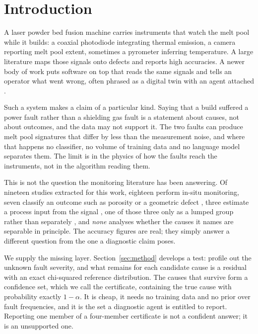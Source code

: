 \documentclass[preprint,12pt]{elsarticle}
\begin{document}
\section{Introduction}
\label{sec:intro}

A laser powder bed fusion machine carries instruments that watch the melt pool
while it builds: a coaxial photodiode integrating thermal emission, a camera
reporting melt pool extent, sometimes a pyrometer inferring temperature. A large
literature maps those signals onto defects and reports high accuracies. A newer
body of work puts software on top that reads the same signals and tells an
operator what went wrong, often phrased as a digital twin with an agent attached
\cite{Chen2025}.

Such a system makes a claim of a particular kind. Saying that a build suffered a
power fault rather than a shielding gas fault is a statement about causes, not
about outcomes, and the data may not support it. The two faults can produce melt
pool signatures that differ by less than the measurement noise, and where that
happens no classifier, no volume of training data and no language model
separates them. The limit is in the physics of how the faults reach the
instruments, not in the algorithm reading them.

This is not the question the monitoring literature has been answering. Of
nineteen studies extracted for this work, eighteen perform in-situ monitoring,
seven classify an outcome such as porosity or a geometric defect
\cite{Scime2019,Bugatti2022}, three estimate a process input from the signal
\cite{Blanc2024,Reijonen2024,kNN2025}, one of those three only as a lumped group
rather than separately \cite{kNN2025}, and \emph{none} analyses whether the
causes it names are separable in principle. The accuracy figures are real; they
simply answer a different question from the one a diagnostic claim poses.

We supply the missing layer. Section~\ref{sec:method} develops a test: profile
out the unknown fault severity, and what remains for each candidate cause is a
residual with an exact chi-squared reference distribution. The causes that
survive form a confidence set, which we call the certificate, containing the
true cause with probability exactly $1-\alpha$. It is cheap, it needs no
training data and no prior over fault frequencies, and it is the set a
diagnostic agent is entitled to report. Reporting one member of a four-member
certificate is not a confident answer; it is an unsupported one.
\end{document}
